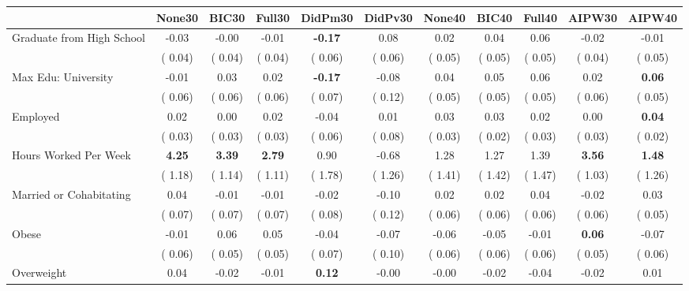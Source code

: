 \begin{tabular}{l c c c c c c c c c c}
\toprule
 & None30 & BIC30 & Full30 & DidPm30 & DidPv30 & None40 & BIC40 & Full40 & AIPW30 & AIPW40 \\
\midrule
Graduate from High School &     -0.03 &     -0.00 &     -0.01 & \textbf{     -0.17 } &      0.08 &      0.02 &      0.04 &      0.06 &     -0.02 &     -0.01 \\
& (     0.04) & (     0.04) & (     0.04) & (     0.06) & (     0.06) & (     0.05) & (     0.05) & (     0.05) & (     0.04) & (     0.05) \\
Max Edu: University &     -0.01 &      0.03 &      0.02 & \textbf{     -0.17 } &     -0.08 &      0.04 &      0.05 &      0.06 &      0.02 & \textbf{     0.06} \\
& (     0.06) & (     0.06) & (     0.06) & (     0.07) & (     0.12) & (     0.05) & (     0.05) & (     0.05) & (     0.06) & (     0.05) \\
Employed &      0.02 &      0.00 &      0.02 &     -0.04 &      0.01 &      0.03 &      0.03 &      0.02 &      0.00 & \textbf{     0.04} \\
& (     0.03) & (     0.03) & (     0.03) & (     0.06) & (     0.08) & (     0.03) & (     0.02) & (     0.03) & (     0.03) & (     0.02) \\
Hours Worked Per Week & \textbf{      4.25 } & \textbf{      3.39 } & \textbf{      2.79 } &      0.90 &     -0.68 &      1.28 &      1.27 &      1.39 & \textbf{     3.56} & \textbf{     1.48} \\
& (     1.18) & (     1.14) & (     1.11) & (     1.78) & (     1.26) & (     1.41) & (     1.42) & (     1.47) & (     1.03) & (     1.26) \\
Married or Cohabitating &      0.04 &     -0.01 &     -0.01 &     -0.02 &     -0.10 &      0.02 &      0.02 &      0.04 &     -0.02 &      0.03 \\
& (     0.07) & (     0.07) & (     0.07) & (     0.08) & (     0.12) & (     0.06) & (     0.06) & (     0.06) & (     0.06) & (     0.05) \\
Obese &     -0.01 &      0.06 &      0.05 &     -0.04 &     -0.07 &     -0.06 &     -0.05 &     -0.01 & \textbf{     0.06} &     -0.07 \\
& (     0.06) & (     0.05) & (     0.05) & (     0.07) & (     0.10) & (     0.06) & (     0.06) & (     0.06) & (     0.05) & (     0.06) \\
Overweight &      0.04 &     -0.02 &     -0.01 & \textbf{      0.12 } &     -0.00 &     -0.00 &     -0.02 &     -0.04 &     -0.02 &      0.01 \\

\end{tabular}
